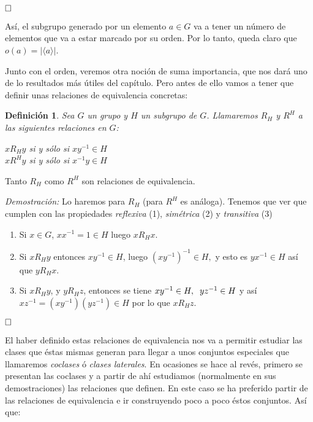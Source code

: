 \documentclass[12pt]{article}
\newtheorem{definition}[theorem]{Definición}
\begin{document}
$\hfill \square$

Así, el subgrupo generado por un elemento $a \in G$ va a tener un número de elementos que va a estar marcado por su orden. Por lo tanto, queda claro que $o(a) = |\langle a \rangle |$.

Junto con el orden, veremos otra noción de suma importancia, que nos dará uno de lo resultados más útiles del capítulo. Pero antes de ello vamos a tener que definir unas relaciones de equivalencia concretas: 

\begin{definition}Sea $G$ un grupo y $H$ un subgrupo de $G$. Llamaremos $R_{H}$ y $R^{H}$ a las siguientes \textit{relaciones} en $G$:
\begin{center}
$xR_{H}y$ si y sólo si $xy^{-1} \in H$\\
$xR^{H}y$ si y sólo si $x^{-1}y \in H$
\end{center}
\end{definition}

Tanto $R_{H}$ como  $R^{H}$ son relaciones de equivalencia.

\emph{Demostración: } Lo haremos para $R_{H}$ (para $R^{H}$ es análoga). Tenemos que ver que cumplen con las propiedades \textit{reflexiva} (1), \textit{simétrica} (2) y \textit{transitiva} (3)\begin{enumerate}
\item Si $x \in G$, $xx^{-1} = 1 \in H$ luego $xR_{H}x$.\vspace{0.2cm}\\
\item Si $xR_{H}y$ entonces $xy^{-1} \in H$, luego $(xy^{-1})^{-1} \in H,$ y esto es $yx^{-1} \in H$ así que $yR_{H}x$.\vspace{0.2cm}\\
\item Si $xR_{H}y$, y $yR_{H}z$, entonces se tiene $xy^{-1} \in H, \hspace{0.2cm} yz^{-1} \in H$
y así $xz^{-1} = (xy^{-1})(yz^{-1}) \in H$ por lo que $xR_{H}z$.
\end{enumerate}
$\hfill \square$

El haber definido estas relaciones de equivalencia nos va a permitir estudiar las clases que éstas mismas generan para llegar a unos conjuntos especiales que llamaremos \textit{coclases} ó \textit{clases laterales}. En ocasiones se hace al revés, primero se presentan las coclases y a partir de ahí estudiamos (normalmente en sus demostraciones) las relaciones que definen. En este caso se ha preferido partir de las relaciones de equivalencia e ir construyendo poco a poco éstos conjuntos. Así que:
\end{document}
